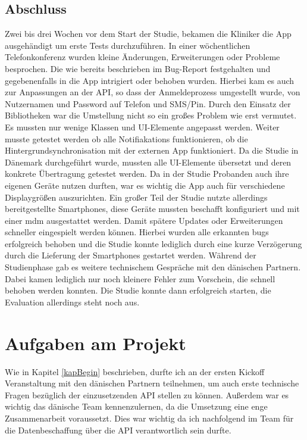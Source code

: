 \subsection{Abschluss}\label{abschluss}
Zwei bis drei Wochen vor dem Start der Studie, bekamen die Kliniker die App ausgehändigt um erste Tests durchzuführen. In einer wöchentlichen Telefonkonferenz wurden kleine Änderungen, Erweiterungen oder  Probleme besprochen. Die wie bereits beschrieben im Bug-Report festgehalten  und gegebenenfalls in die App intrigiert oder behoben wurden. Hierbei kam es auch  zur Anpassungen an der API, so dass der Anmeldeprozess umgestellt wurde, von Nutzernamen und Password auf Telefon und SMS/Pin. Durch den Einsatz der Bibliotheken war die Umstellung nicht so ein großes Problem wie erst vermutet. Es mussten nur wenige Klassen und UI-Elemente angepasst werden. Weiter musste getestet werden ob alle Notifiakations funktionieren, ob die Hintergrundsynchronisation mit der externen App funktioniert. Da die Studie in Dänemark durchgeführt wurde, mussten  alle UI-Elemente übersetzt und deren konkrete Übertragung getestet werden. Da in der Studie Probanden auch ihre eigenen Geräte nutzen durften, war es wichtig die App auch für verschiedene Displaygrößen auszurichten. Ein großer Teil der Studie nutzte allerdings bereitgestellte Smartphones, diese Geräte mussten beschafft konfiguriert und mit einer \ac{mdm}%
ausgestattet werden. Damit spätere Updates oder Erweiterungen schneller eingespielt
 werden können. Hierbei wurden alle erkannten \gls{bug}s erfolgreich behoben und die Studie konnte lediglich durch eine kurze Verzögerung durch die Lieferung der Smartphones gestartet werden. Während der Studienphase gab es weitere technischem Gespräche mit den dänischen Partnern. Dabei kamen lediglich nur noch kleinere Fehler zum Vorschein, die schnell behoben werden konnten. Die Studie konnte dann erfolgreich starten, die Evaluation allerdings steht noch aus.

\section{Aufgaben am Projekt}
Wie in Kapitel \ref{kapBegin} beschrieben, durfte ich an der ersten Kickoff Veranstaltung mit den dänischen Partnern teilnehmen, um auch erste technische Fragen bezüglich der einzusetzenden API stellen zu können. Außerdem war es wichtig das dänische Team kennenzulernen, da die Umsetzung eine enge Zusammenarbeit voraussetzt. Dies war wichtig da ich nachfolgend im Team für die Datenbeschaffung über die API verantwortlich sein durfte.

